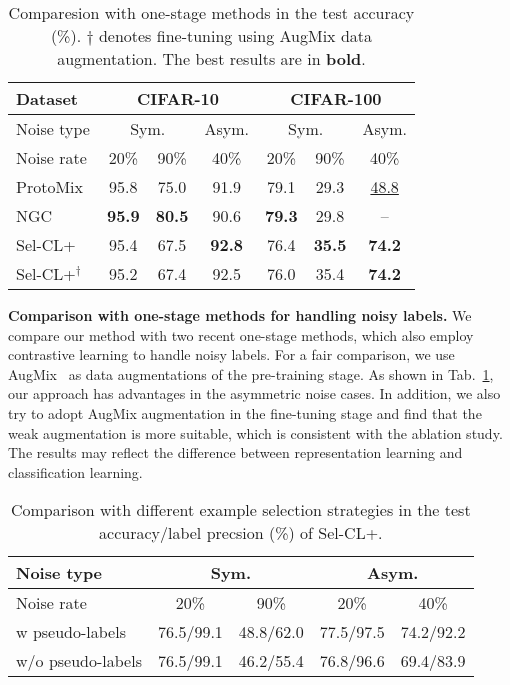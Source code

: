 \documentclass[10pt,twocolumn,letterpaper]{article}
\newcommand{\myPara}[1]{\vspace{.05in}\noindent\textbf{#1}}
\begin{document}
\begin{table}[t]
	\caption{Comparesion with one-stage methods in the test accuracy (\%). $\dagger$ denotes fine-tuning using AugMix data augmentation. The best results are in \textbf{bold}.} 
	\vspace{-5pt}\centering
	\small
	\setlength\tabcolsep{5pt}
	\begin{tabular}{l|c|c|c|c|c|c}
		\hline \multirow{1}{*}{Dataset} & \multicolumn{3}{c}{CIFAR-10} & \multicolumn{3}{|c}{CIFAR-100} \\
		\hline \multirow{1}{*}{Noise type} & \multicolumn{2}{c}{Sym.} & \multicolumn{1}{|c}{Asym.} & \multicolumn{2}{|c}{Sym.} & \multicolumn{1}{|c}{Asym.}\\
		\hline
		Noise rate & 
		20\% & 90\% & 40\% & 20\% & 90\% &  40\% \\
		\hline			
		ProtoMix~\cite{li2020learning} & 95.8 & 75.0 & 91.9 & 79.1 & 29.3 & \underline{48.8} \\		
		NGC~\cite{Zhi2021ICCV} & \textbf{95.9} & \textbf{80.5} & 90.6 & \textbf{79.3} & 29.8 & --\\
		\hline
Sel-CL+ & 95.4 & 67.5 & \textbf{92.8} & 76.4 & \textbf{35.5} &  \textbf{74.2} \\
		Sel-CL+$^\dagger$ & 95.2 & 67.4 & 92.5 & 76.0 & 35.4 & \textbf{74.2} \\
		\hline
	\end{tabular}
	\label{one-stage}
\end{table}


\myPara{Comparison with one-stage methods for handling noisy labels.}	
We compare our method with two recent one-stage methods, which also employ contrastive learning to handle noisy labels. For a fair comparison, we use AugMix~\cite{HendrycksMCZGL20} as data augmentations of the pre-training stage. As shown in Tab.~\ref{one-stage}, our approach has advantages in the asymmetric noise cases. In addition, we also try to adopt AugMix augmentation in the fine-tuning stage and find that the weak augmentation is more suitable, which is consistent with the ablation study. The results may reflect the difference between representation learning and classification learning.

\begin{table}[t]
	\caption{Comparison with different example selection strategies in the test accuracy/label precsion (\%) of Sel-CL+.} \vspace{-5pt}
	\centering
	\small
	\setlength\tabcolsep{4pt}
	\begin{tabular}{l|c|c|c|c}
		\hline \multirow{1}{*}{Noise type} & \multicolumn{2}{c}{Sym.} & \multicolumn{2}{|c}{Asym.} \\
		\hline
		Noise rate & 
		20\% & 90\% & 20\% & 40\% \\
		\hline
		w pseudo-labels & 76.5/99.1 & 48.8/62.0 & 77.5/97.5 & 74.2/92.2 \\
		w/o pseudo-labels & 76.5/99.1 & 46.2/55.4 & 76.8/96.6 & 69.4/83.9 \\
		\hline
	\end{tabular}
	\label{pseudo-labels}
	\vspace{-6pt}
\end{table}
\end{document}

